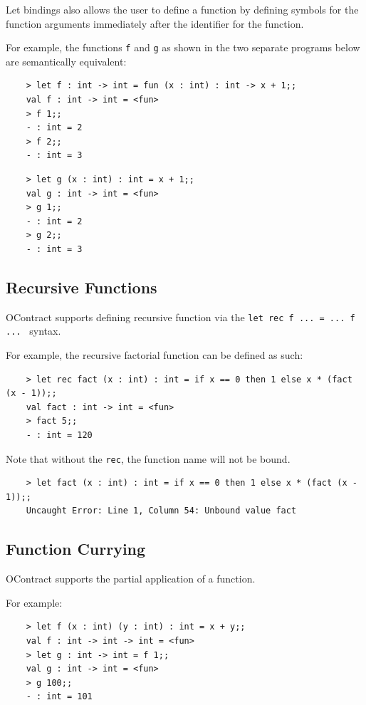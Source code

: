 \documentclass[a4paper]{article}
\begin{document}
Let bindings also allows the user to define a function by defining symbols for the function arguments immediately after the identifier for the function.

For example, the functions \texttt{f} and \texttt{g} as shown in the two separate programs below are semantically equivalent:

\begin{verbatim}
    > let f : int -> int = fun (x : int) : int -> x + 1;;
    val f : int -> int = <fun>
    > f 1;;
    - : int = 2
    > f 2;;
    - : int = 3
\end{verbatim}

\begin{verbatim}
    > let g (x : int) : int = x + 1;;
    val g : int -> int = <fun>
    > g 1;;
    - : int = 2
    > g 2;;
    - : int = 3
\end{verbatim}

\subsection{Recursive Functions}

OContract supports defining recursive function via the \texttt{let rec f ... = ... f ... } syntax.

For example, the recursive factorial function can be defined as such:

\begin{verbatim}
    > let rec fact (x : int) : int = if x == 0 then 1 else x * (fact (x - 1));;
    val fact : int -> int = <fun>
    > fact 5;;
    - : int = 120
\end{verbatim}

Note that without the \texttt{rec}, the function name will not be bound.

\begin{verbatim}
    > let fact (x : int) : int = if x == 0 then 1 else x * (fact (x - 1));;
    Uncaught Error: Line 1, Column 54: Unbound value fact
\end{verbatim}

\subsection{Function Currying}

OContract supports the partial application of a function.

For example:

\begin{verbatim}
    > let f (x : int) (y : int) : int = x + y;;
    val f : int -> int -> int = <fun>
    > let g : int -> int = f 1;;
    val g : int -> int = <fun>
    > g 100;;
    - : int = 101
\end{verbatim}
\end{document}
